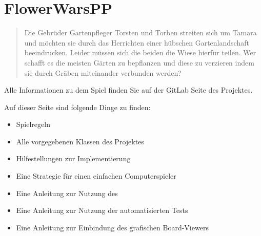 \section*{FlowerWarsPP}
\begin{quote}
Die Gebrüder Gartenpfleger Torsten und Torben streiten sich um Tamara und möchten sie durch das Herrichten einer hübschen Gartenlandschaft beeindrucken. Leider müssen sich die beiden die Wiese hierfür teilen. Wer schafft es die meisten Gärten zu bepflanzen und diese zu verzieren indem sie durch Gräben miteinander verbunden werden?
\end{quote}

Alle Informationen zu dem Spiel finden Sie auf der GitLab Seite des Projektes.

\href{https://gitlab.gwdg.de/app/flowerwarspp}{}

\bigskip
\bigskip

Auf dieser Seite sind folgende Dinge zu finden:
\begin{itemize}
\item Spielregeln
\item Alle vorgegebenen Klassen des Projektes
\item Hilfestellungen zur Implementierung
\item Eine Strategie für einen einfachen Computerspieler
\item Eine Anleitung zur Nutzung des 
\item Eine Anleitung zur Nutzung der automatisierten Tests
\item Eine Anleitung zur Einbindung des grafischen Board-Viewers
\end{itemize}
